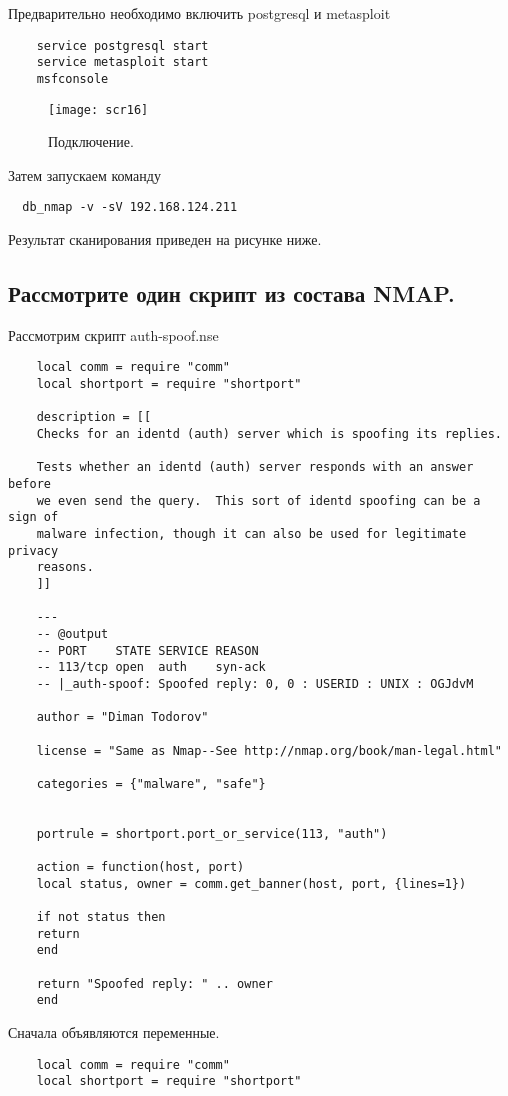 \documentclass{article}
\begin{document}
 Предварительно необходимо включить postgresql и metasploit
 \begin{verbatim}
 	service postgresql start
 	service metasploit start
 	msfconsole
 \end{verbatim}
 \begin{figure}[h!]
 	\centering
 	\texttt{[image: scr16]}
 	\caption{Подключение.}
 \end{figure}
 
 Затем запускаем команду
  \begin{verbatim}
  db_nmap -v -sV 192.168.124.211
  \end{verbatim}
  Результат сканирования приведен на рисунке ниже.
  
 \subsection{Рассмотрите один скрипт из состава NMAP.\\}
 Рассмотрим скрипт auth-spoof.nse
 \begin{verbatim}
 	local comm = require "comm"
 	local shortport = require "shortport"
 	
 	description = [[
 	Checks for an identd (auth) server which is spoofing its replies.
 	
 	Tests whether an identd (auth) server responds with an answer before
 	we even send the query.  This sort of identd spoofing can be a sign of
 	malware infection, though it can also be used for legitimate privacy
 	reasons.
 	]]
 	
 	---
 	-- @output
 	-- PORT    STATE SERVICE REASON
 	-- 113/tcp open  auth    syn-ack
 	-- |_auth-spoof: Spoofed reply: 0, 0 : USERID : UNIX : OGJdvM
 	
 	author = "Diman Todorov"
 	
 	license = "Same as Nmap--See http://nmap.org/book/man-legal.html"
 	
 	categories = {"malware", "safe"}
 	
 	
 	portrule = shortport.port_or_service(113, "auth")
 	
 	action = function(host, port)
 	local status, owner = comm.get_banner(host, port, {lines=1})
 	
 	if not status then
 	return
 	end
 	
 	return "Spoofed reply: " .. owner
 	end
 \end{verbatim}
  
  Сначала объявляются переменные.
  \begin{verbatim}
  	local comm = require "comm"
  	local shortport = require "shortport"
  \end{verbatim}
  
\end{document}
